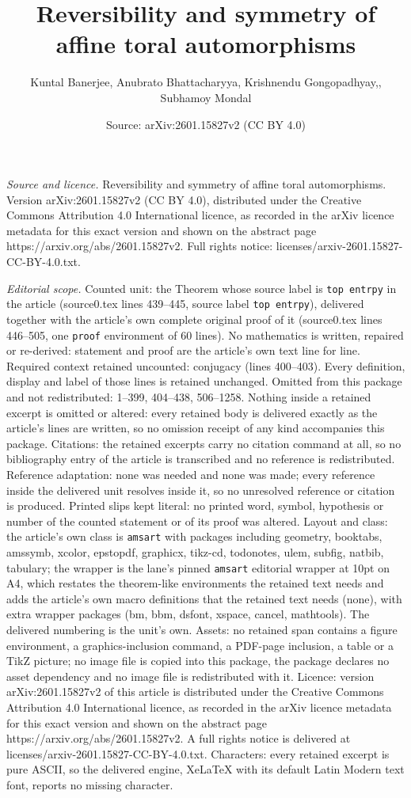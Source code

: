 \documentclass[10pt,a4paper]{amsart}
\title[Reversibility and symmetry of affine toral automorphisms]{Reversibility and symmetry of affine toral automorphisms}
\author{Kuntal Banerjee, Anubrato Bhattacharyya, Krishnendu Gongopadhyay,, Subhamoy Mondal}
\date{Source: arXiv:2601.15827v2 (CC BY 4.0)}
\begin{document}
\maketitle

\noindent\emph{Source and licence.} Reversibility and symmetry of affine toral automorphisms. Version arXiv:2601.15827v2 (CC BY 4.0), distributed under the Creative Commons Attribution 4.0 International licence, as recorded in the arXiv licence metadata for this exact version and shown on the abstract page https://arxiv.org/abs/2601.15827v2. Full rights notice: licenses/arxiv-2601.15827-CC-BY-4.0.txt.\par\smallskip

\noindent\textit{Editorial scope.} Counted unit: the Theorem whose source label is \texttt{top entrpy} in the article (source0.tex lines 439--445, source label \texttt{top entrpy}), delivered together with the article's own complete original proof of it (source0.tex lines 446--505, one \texttt{proof} environment of 60 lines). No mathematics is written, repaired or re-derived: statement and proof are the article's own text line for line. Required context retained uncounted: conjugacy (lines 400--403). Every definition, display and label of those lines is retained unchanged. Omitted from this package and not redistributed: 1--399, 404--438, 506--1258. Nothing inside a retained excerpt is omitted or altered: every retained body is delivered exactly as the article's lines are written, so no omission receipt of any kind accompanies this package. Citations: the retained excerpts carry no citation command at all, so no bibliography entry of the article is transcribed and no reference is redistributed. Reference adaptation: none was needed and none was made; every reference inside the delivered unit resolves inside it, so no unresolved reference or citation is produced. Printed slips kept literal: no printed word, symbol, hypothesis or number of the counted statement or of its proof was altered. Layout and class: the article's own class is \texttt{amsart} with packages including geometry, booktabs, amssymb, xcolor, epstopdf, graphicx, tikz-cd, todonotes, ulem, subfig, natbib, tabulary; the wrapper is the lane's pinned \texttt{amsart} editorial wrapper at 10pt on A4, which restates the theorem-like environments the retained text needs and adds the article's own macro definitions that the retained text needs (none), with extra wrapper packages (bm, bbm, dsfont, xspace, cancel, mathtools). The delivered numbering is the unit's own. Assets: no retained span contains a figure environment, a graphics-inclusion command, a PDF-page inclusion, a table or a TikZ picture; no image file is copied into this package, the package declares no asset dependency and no image file is redistributed with it. Licence: version arXiv:2601.15827v2 of this article is distributed under the Creative Commons Attribution 4.0 International licence, as recorded in the arXiv licence metadata for this exact version and shown on the abstract page https://arxiv.org/abs/2601.15827v2. A full rights notice is delivered at licenses/arxiv-2601.15827-CC-BY-4.0.txt. Characters: every retained excerpt is pure ASCII, so the delivered engine, XeLaTeX with its default Latin Modern text font, reports no missing character.
\end{document}
